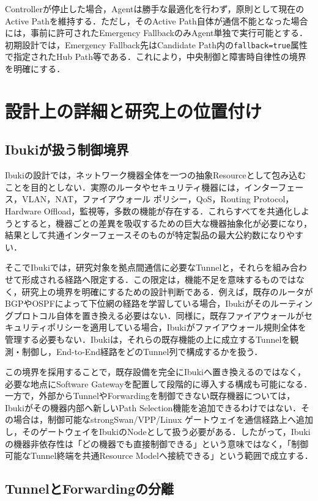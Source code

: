\documentclass[11pt,a4paper,twoside]{ltjsarticle}
\begin{document}
Controllerが停止した場合，Agentは勝手な最適化を行わず，原則として現在のActive Pathを維持する．ただし，そのActive Path自体が通信不能となった場合には，事前に許可されたEmergency FallbackのみAgent単独で実行可能とする．初期設計では，Emergency Fallback先はCandidate Path内の\texttt{fallback=true}属性で指定されたHub Path等である．これにより，中央制御と障害時自律性の境界を明確にする．


\section{設計上の詳細と研究上の位置付け}

\subsection{Ibukiが扱う制御境界}

Ibukiの設計では，ネットワーク機器全体を一つの抽象Resourceとして包み込むことを目的としない．実際のルータやセキュリティ機器には，インターフェース，VLAN，NAT，ファイアウォール ポリシー，QoS，Routing Protocol，Hardware Offload，監視等，多数の機能が存在する．これらすべてを共通化しようとすると，機器ごとの差異を吸収するための巨大な機器抽象化が必要になり，結果として共通インターフェースそのものが特定製品の最大公約数になりやすい．

そこでIbukiでは，研究対象を拠点間通信に必要なTunnelと，それらを組み合わせて形成される経路へ限定する．この限定は，機能不足を意味するものではなく，研究上の境界を明確にするための設計判断である．例えば，既存のルータがBGPやOSPFによって下位網の経路を学習している場合，Ibukiがそのルーティングプロトコル自体を置き換える必要はない．同様に，既存ファイアウォールがセキュリティポリシーを適用している場合，Ibukiがファイアウォール規則全体を管理する必要もない．Ibukiは，それらの既存機能の上に成立するTunnelを観測・制御し，End-to-End経路をどのTunnel列で構成するかを扱う．

この境界を採用することで，既存設備を完全にIbukiへ置き換えるのではなく，必要な地点にSoftware Gatewayを配置して段階的に導入する構成も可能になる．一方で，外部からTunnelやForwardingを制御できない既存機器については，Ibukiがその機器内部へ新しいPath Selection機能を追加できるわけではない．その場合は，制御可能なstrongSwan/VPP/Linux ゲートウェイを通信経路上へ追加し，そのゲートウェイをIbukiのNodeとして扱う必要がある．したがって，Ibukiの機器非依存性は「どの機器でも直接制御できる」という意味ではなく，「制御可能なTunnel終端を共通Resource Modelへ接続できる」という範囲で成立する．

\subsection{TunnelとForwardingの分離}
\end{document}
